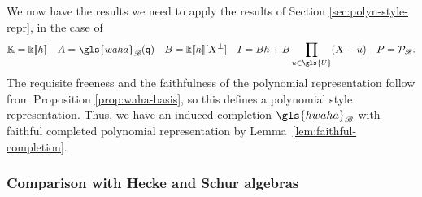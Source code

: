 \documentclass[ALCO,ThmDefs,Unicode,epreuves]{cedram}
\newcommand{\pq}{\mathsf{q}}
\newcommand{\K}{\Bbbk}%
\newcommand{\waha}{\gls{waha}}
\newcommand\llbracket{[\![}
\newcommand\rrbracket{]\!]}
\begin{document}
We now have the results we need to apply the results of Section
\ref{sec:polyn-style-repr}, in the case of
\begin{equation}
\mathbb{K}=\K\llbracket h\rrbracket \quad A=\waha_{\mathscr{B}}(\pq)\quad
 B=\K\llbracket h\rrbracket [X^{\pm}]\quad I=Bh+B \prod_{u\in \gls{U}}(X-u)\quad P=\mathcal{P}_{\mathscr{B}}.\label{eq:wHecke-PR}
\end{equation}
The requisite freeness and the faithfulness of the polynomial
representation follow from Proposition
\ref{prop:waha-basis}, so this defines a polynomial style
representation. Thus, we have an induced completion
$\gls{hwaha}_{\mathscr{B}}$ with faithful completed polynomial
representation by Lemma~\ref{lem:faithful-completion}.


\subsubsection{Comparison with Hecke and Schur algebras}
\label{sec:comp-with-hecke}
\end{document}
